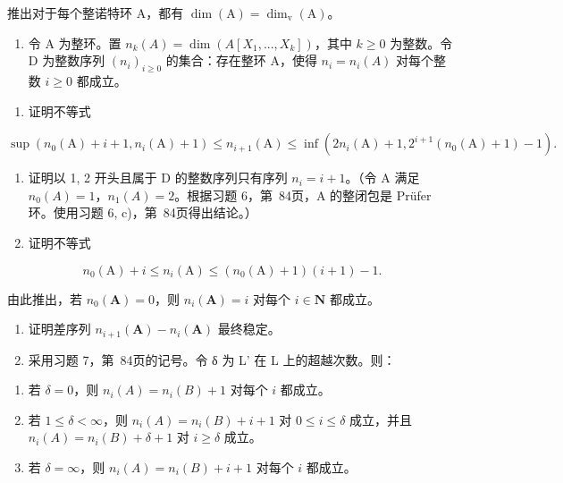 推出对于每个整诺特环 A，都有 \(\dim(\mathrm{A}) = \dim_{\mathrm{v}}(\mathrm{A})\)。

\begin{enumerate}
\def\labelenumi{\arabic{enumi})}
\setcounter{enumi}{16}
\tightlist
\item
  令 A 为整环。置 \(n_k(A) = \dim(A[X_1, ..., X_k])\)，其中 \(k \geqslant 0\) 为整数。令 D 为整数序列 \((n_i)_{i \geqslant 0}\) 的集合：存在整环 A，使得 \(n_i = n_i(A)\) 对每个整数 \(i \geqslant 0\) 都成立。
\end{enumerate}

\begin{enumerate}
\def\labelenumi{\alph{enumi})}
\tightlist
\item
  证明不等式
\end{enumerate}

\[
\sup \left(n _ {0} (\mathrm{A}) + i + 1, n _ {i} (\mathrm{A}) + 1\right) \leqslant n _ {i + 1} (\mathrm{A}) \leqslant \inf \left(2 n _ {i} (\mathrm{A}) + 1, 2 ^ {i + 1} \left(n _ {0} (\mathrm{A}) + 1\right) - 1\right).
\]

\begin{enumerate}
\def\labelenumi{\alph{enumi})}
\setcounter{enumi}{1}
\tightlist
\item
  证明以 1, 2 开头且属于 D 的整数序列只有序列 \(n_{i}=i+1\)。（令 A 满足 \(n_{0}(A)=1\)，\(n_{1}(A)=2\)。根据习题 6，第~84页，A 的整闭包是 Prüfer 环。使用习题 6, c)，第~84页得出结论。）\\
\item
  证明不等式
\end{enumerate}

\[
n _ {0} (\mathrm{A}) + i \leqslant n _ {i} (\mathrm{A}) \leqslant (n _ {0} (\mathrm{A}) + 1) (i + 1) - 1.
\]

  由此推出，若 \(n_0(\mathbf{A}) = 0\)，则 \(n_i(\mathbf{A}) = i\) 对每个 \(i \in \mathbf{N}\) 都成立。

\begin{enumerate}
\def\labelenumi{\alph{enumi})}
\setcounter{enumi}{3}
\item
  证明差序列 \(n_{i+1}(\mathbf{A}) - n_i(\mathbf{A})\) 最终稳定。
\item
  采用习题 7，第~84页的记号。令 δ 为 L' 在 L 上的超越次数。则：
\end{enumerate}

\begin{enumerate}
\def\labelenumi{(\roman{enumi})}
\item
  若 \(\delta = 0\)，则 \(n_i(A) = n_i(B) + 1\) 对每个 \(i\) 都成立。
\item
  若 \(1 \leqslant \delta < \infty\)，则 \(n_i(A) = n_i(B) + i + 1\) 对 \(0 \leqslant i \leqslant \delta\) 成立，并且 \(n_i(A) = n_i(B) + \delta + 1\) 对 \(i \geqslant \delta\) 成立。
\item
  若 \(\delta = \infty\)，则 \(n_i(A) = n_i(B) + i + 1\) 对每个 \(i\) 都成立。
\end{enumerate}


